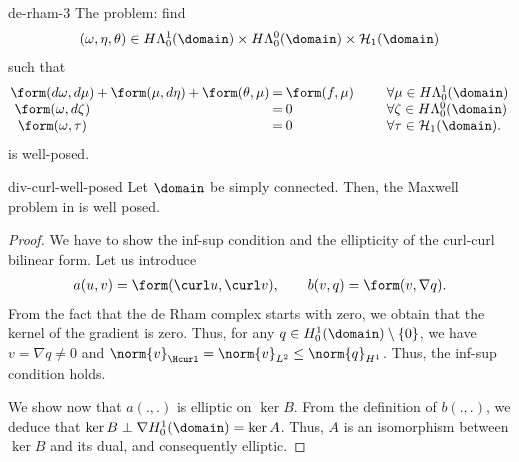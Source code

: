 \begin{Lemma}{de-rham-3}
  The problem: find
  \begin{gather}
    (\omega,\eta,\theta)
    \in H\Lambda^1_0(\domain)
    \times H\Lambda^{0}_0(\domain)
    \times \mathcal H_1(\domain)
  \end{gather}
   such that
  \begin{gather}
    \arraycolsep1pt
    \begin{array}{cccccclll}
      \form(d \omega, d\mu) &+& \form(\mu,d\eta) &+& \form(\theta,\mu)
      &=& \form(f,\mu)
      & \qquad & \forall \mu\in H\Lambda^1_0(\domain)
      \\
      \form(\omega,d\zeta) && && &=&0
      & \qquad & \forall \zeta\in H\Lambda^{0}_0(\domain)
      \\
      \form(\omega,\tau) && && &=& 0
      & \qquad & \forall \tau\in \mathcal H_1(\domain).
    \end{array}
  \end{gather}
  is well-posed.
\end{Lemma}

\begin{Theorem}{div-curl-well-posed}
  Let $\domain$ be simply connected. Then, the Maxwell problem in
   is well posed.
\end{Theorem}

\begin{proof}
  We have to show the inf-sup condition and the ellipticity of the
  curl-curl bilinear form. Let us introduce
  \begin{gather}
    a(u,v) = \form(\curl u, \curl v),
    \qquad
    b(v,q) = \form(v,\nabla q).
  \end{gather}
  From the fact that the de Rham complex starts with zero, we obtain
  that the kernel of the gradient is zero. Thus, for any $q\in
  H^1_0(\domain)\setminus\{0\}$, we have $v = \nabla q \neq 0$ and
  $\norm{v}_{\Hcurl} = \norm{v}_{L^2} \le \norm{q}_{H^1}$. Thus, the
  inf-sup condition holds.

  We show now that $a(.,.)$ is elliptic on $\ker B$. From the
  definition of $b(.,.)$, we deduce that
  $\ker B \perp \nabla H^1_0(\domain) = \ker A$. Thus, $A$ is an
  isomorphism between $\ker B$ and its dual, and consequently
  elliptic.
\end{proof}

